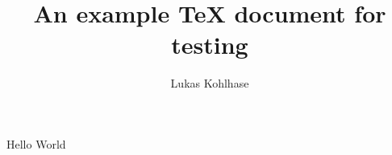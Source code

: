 \documentclass{article}
\author{Lukas Kohlhase}
\title{An example TeX document for testing}
\begin{document}
Hello World
\end{document}
